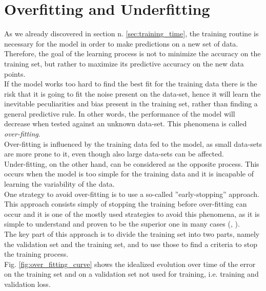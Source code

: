 



\section{Overfitting and Underfitting }\label{sec:of_uf}
As we already discovered in section n. \ref{sec:training_time}, the training routine is necessary for the model in order to make predictions on a new set of data. Therefore, the goal of the learning process is not to minimize the accuracy on the training set, but rather to maximize its predictive accuracy on the new data points. \citep{dietterich1995overfitting}\\
If the model works too hard to find the best fit for the training data there is the risk that it is going to fit the noise present on the data-set, hence it will learn the inevitable peculiarities and bias present in the training set, rather than finding a general predictive rule. In other words, the performance of the model will decrease when tested against an unknown data-set.\cite{jabbar2015methods} This phenomena is called \textit{over-fitting}. \citep{dietterich1995overfitting}\\
Over-fitting is influenced by the training data fed to the model, as small data-sets are more prone to it, even though also large data-sets can be affected. \cite{10.1016/j.inffus.2008.11.003}\\
Under-fitting, on the other hand, can be considered as the opposite process. This occurs when the model is too simple for the training data and it is incapable of learning the variability of the data. \cite{10.1016/j.inffus.2008.11.003}\\

One strategy to avoid over-fitting is to use a so-called ''early-stopping'' approach. This approach consists simply of stopping the training before over-fitting can occur and it is one of the mostly used strategies to avoid this phenomena, as it is simple to understand and proven to be the superior one in many cases (\citep{FINNOFF1993771}, \cite{early_stopping}). \\
The key part of this approach is to divide the training set into two parts, namely the validation set and the training set, and to use those to find a criteria to stop the training process. \\
Fig. \ref{fig:over_fitting_curve} shows the idealized evolution over time of the error on the training set and on a validation set not used for training, i.e. training and validation loss.\cite{early_stopping}

